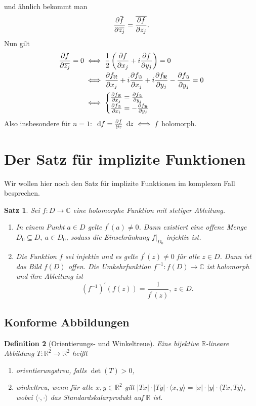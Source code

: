 \documentclass[a4paper,12pt]{book}
\theoremstyle{newthm}
\newtheorem{thm}{Satz}[section]
\theoremstyle{newdef}
\newtheorem{defn}[thm]{Definition}
\theoremstyle{newrem}
\newcommand{\R}{\mathbb{R}}
\newcommand{\C}{\mathbb{C}}
\renewcommand{\d}{\ \operatorname{d}\hspace{-2px}}
\newcommand{\del}{\partial}
\newcommand{\bound}[2]{\left.#1\right|_{#2}}
\newcommand{\overbar}[1]{\mkern 1.5mu\overline{\mkern-1.5mu#1\mkern-1.5mu}\mkern 1.5mu}
\begin{document}
		und ähnlich bekommt man 
		$$ \frac{\del \overbar{f}}{\del \overbar{z_j}} = \overbar{\frac{\del f}{\del z_j}}. $$
		Nun gilt
		\begin{align*}
			\frac{\del f}{\del \overbar{z_j}} = 0 &\iff \frac{1}{2} \left( \frac{\del f}{\del x_j} + i\frac{\del f}{\del y_j} \right) = 0\\
			&\iff \frac{\del f_\Re}{\del x_j} + i\frac{\del f_\Im}{\del x_j} + i\frac{\del f_\Re}{\del y_j} - \frac{\del f_\Im}{\del y_j} = 0\\
			&\iff \begin{cases}
			\frac{\del f_\Re}{\del x_j} = \frac{\del f_\Im}{\del y_j}\\
			\frac{\del f_\Im}{\del x_i} = -\frac{\del f_\Re}{\del y_j}
			\end{cases}
		\end{align*}
		Also insbesondere für $n=1$: $ \d f = \frac{\del f}{\del z}\d z \iff f $ holomorph. 
			
	
	\section{Der Satz für implizite Funktionen}
		
		Wir wollen hier noch den Satz für implizite Funktionen im komplexen Fall besprechen.
		
		\begin{thm}
			Sei $ f: D \to \C $ eine holomorphe Funktion mit stetiger Ableitung.
			\begin{enumerate}[label={\alph*})]
				\item In einem Punkt $a \in D$ gelte $ f^\prime(a) \neq 0 $. Dann existiert eine offene Menge $ D_0 \subseteq D,\ a \in D_0 $, sodass die Einschränkung $ \bound{f}{D_0} $ injektiv ist.
				\item Die Funktion $f$ sei injektiv und es gelte $ f^\prime(z) \neq 0 $ für alle $z \in D$. Dann ist das Bild $f(D)$ offen. Die Umkehrfunktion $ f^{-1}: f(D) \to \C $ ist holomorph und ihre Ableitung ist 
				$$ \left(f^{-1}\right)^\prime (f(z)) = \frac{1}{f^\prime(z)},\ z \in D. $$
			\end{enumerate}
		\end{thm}
		
		\subsection*{Konforme Abbildungen}
		
		\begin{defn}[Orientierungs- und Winkeltreue]
			Eine bijektive $\R$-lineare Abbildung $ T: \R^2 \to \R^2 $ heißt
			\begin{enumerate}[label={\alph*})]
				\item \emph{orientierungstreu}, falls $\det(T)>0$,
				\item \emph{winkeltreu}, wenn für alle $x,y \in \R^2$ gilt $ |Tx|\cdot |Ty| \cdot \langle x,y\rangle = |x| \cdot |y|\cdot \langle Tx,Ty \rangle $, wobei $\langle\cdot ,\cdot \rangle$ das Standardskalarprodukt auf $\R$ ist.
			\end{enumerate}
		\end{defn}
		
\end{document}
